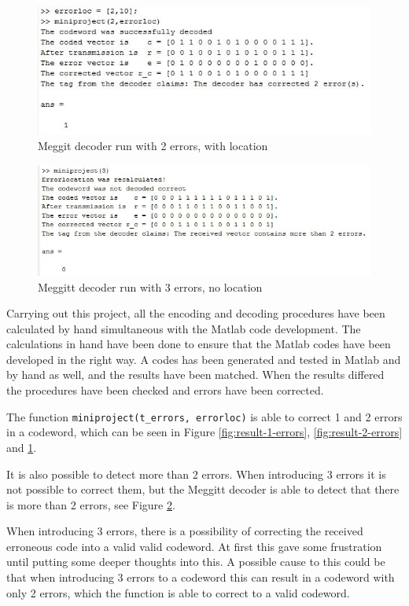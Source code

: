 \documentclass[Main]{subfiles}
\begin{document}
\begin{figure}[h!]
\centering
\includegraphics[width=0.7\linewidth]{./Picture/result-2-errors-location}
\caption{Meggit decoder run with 2 errors, with location}
\label{fig:result-2-errors-location}
\end{figure}

\begin{figure}[h!]
\centering
\includegraphics[width=0.7\linewidth]{./Picture/result-3-errors}
\caption{Meggitt decoder run with 3 errors, no location}
\label{fig:result-3-errors}
\end{figure}

Carrying out this project, all the encoding and decoding procedures have been calculated by hand simultaneous with the Matlab code development.
The calculations in hand have been done to ensure that the Matlab codes have been developed in the right way.
A codes has been generated and tested in Matlab and by hand as well, and the results have been matched.
When the results differed the procedures have been checked and errors have been corrected.

The function \texttt{miniproject(t\_errors, errorloc)} is able to correct 1 and 2 errors in a codeword, which can be seen in Figure \ref{fig:result-1-errors}, \ref{fig:result-2-errors} and \ref{fig:result-2-errors-location}.

It is also possible to detect more than 2 errors.
When introducing 3 errors it is not possible to correct them, but the Meggitt decoder is able to detect that there is more than 2 errors, see Figure \ref{fig:result-3-errors}.

When introducing 3 errors, there is a possibility of correcting the received erroneous code into a valid valid codeword.
At first this gave some frustration until putting some deeper thoughts into this.
A possible cause to this could be that when introducing 3 errors to a codeword this can result in a codeword with only 2 errors, which the function is able to correct to a valid codeword.
\end{document}
